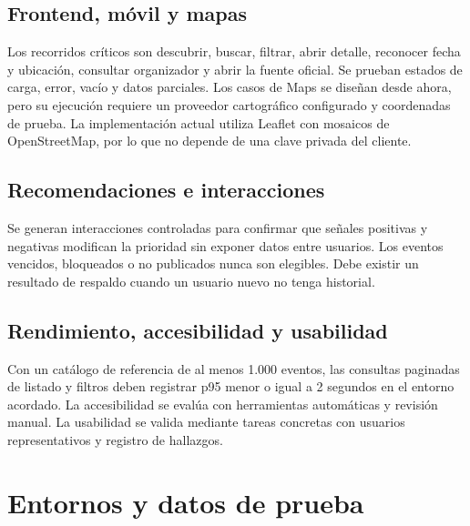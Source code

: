 \documentclass[11pt,a4paper]{article}
\begin{document}
\subsection{Frontend, móvil y mapas}

Los recorridos críticos son descubrir, buscar, filtrar, abrir detalle, reconocer fecha y
ubicación, consultar organizador y abrir la fuente oficial. Se prueban estados de carga,
error, vacío y datos parciales. Los casos de Maps se diseñan desde ahora, pero su ejecución
requiere un proveedor cartográfico configurado y coordenadas de prueba. La implementación
actual utiliza Leaflet con mosaicos de OpenStreetMap, por lo que no depende de una clave
privada del cliente.

\subsection{Recomendaciones e interacciones}

Se generan interacciones controladas para confirmar que señales positivas y negativas
modifican la prioridad sin exponer datos entre usuarios. Los eventos vencidos, bloqueados
o no publicados nunca son elegibles. Debe existir un resultado de respaldo cuando un
usuario nuevo no tenga historial.

\subsection{Rendimiento, accesibilidad y usabilidad}

Con un catálogo de referencia de al menos 1.000 eventos, las consultas paginadas de
listado y filtros deben registrar p95 menor o igual a 2 segundos en el entorno acordado.
La accesibilidad se evalúa con herramientas automáticas y revisión manual. La usabilidad
se valida mediante tareas concretas con usuarios representativos y registro de hallazgos.

\section{Entornos y datos de prueba}
\end{document}
